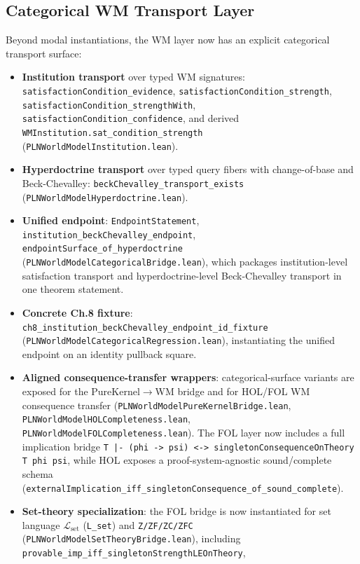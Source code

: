 \documentclass[]{article}
\newcommand{\code}[1]{\texttt{#1}}
\begin{document}
\subsection{Categorical WM Transport Layer}
\label{sec:categorical-wm-transport}

Beyond modal instantiations, the WM layer now has an explicit categorical
transport surface:
\begin{itemize}[leftmargin=2em]
\item \textbf{Institution transport} over typed WM signatures:
  \code{satisfactionCondition\_evidence},
  \code{satisfactionCondition\_strength},
  \code{satisfactionCondition\_strengthWith},
  \code{satisfactionCondition\_confidence},
  and derived \code{WMInstitution.sat\_condition\_strength}
  (\code{PLNWorldModelInstitution.lean}).
\item \textbf{Hyperdoctrine transport} over typed query fibers with
  change-of-base and Beck-Chevalley:
  \code{beckChevalley\_transport\_exists}
  (\code{PLNWorldModelHyperdoctrine.lean}).
\item \textbf{Unified endpoint}:
  \code{EndpointStatement},
  \code{institution\_beckChevalley\_endpoint},
  \code{endpointSurface\_of\_hyperdoctrine}
  (\code{PLNWorldModelCategoricalBridge.lean}),
  which packages institution-level satisfaction transport and
  hyperdoctrine-level Beck-Chevalley transport in one theorem statement.
\item \textbf{Concrete Ch.8 fixture}:
  \code{ch8\_institution\_beckChevalley\_endpoint\_id\_fixture}
  (\code{PLNWorldModelCategoricalRegression.lean}),
  instantiating the unified endpoint on an identity pullback square.
\item \textbf{Aligned consequence-transfer wrappers}:
  categorical-surface variants are exposed for the PureKernel$\rightarrow$WM
  bridge and for HOL/FOL WM consequence transfer
  (\code{PLNWorldModelPureKernelBridge.lean},
   \code{PLNWorldModelHOLCompleteness.lean},
   \code{PLNWorldModelFOLCompleteness.lean}).
  The FOL layer now includes a full implication bridge
  \code{T |- (phi -> psi) <-> singletonConsequenceOnTheory T phi psi},
  while HOL exposes a proof-system-agnostic sound/complete schema
  (\code{externalImplication\_iff\_singletonConsequence\_of\_sound\_complete}).
\item \textbf{Set-theory specialization}: the FOL bridge is now instantiated for
  set language $\mathcal L_{\mathrm{set}}$ (\code{L\_set}) and
  \code{Z/ZF/ZC/ZFC}
  (\code{PLNWorldModelSetTheoryBridge.lean}), including
  \code{provable\_imp\_iff\_singletonStrengthLEOnTheory},

\end{itemize}
\end{document}
